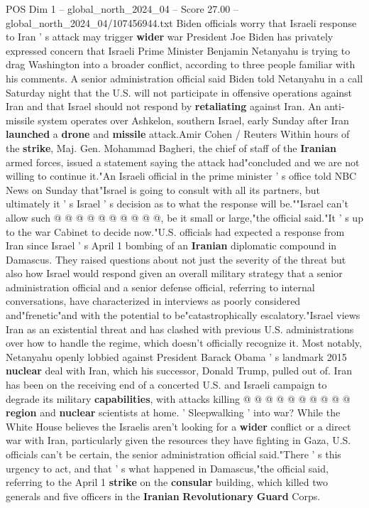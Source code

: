 \begin{textsample}{POS Dim 1 – global\_north\_2024\_04 – Score 27.00 – global\_north\_2024\_04/107456944.txt}  \label{ex:f1_pos_160}
Biden officials worry that Israeli response to Iran ' s attack may trigger \textbf{wider} war President Joe Biden has privately expressed concern that Israeli Prime Minister Benjamin Netanyahu is trying to drag Washington into a broader conflict, according to three people familiar with his comments.
A senior administration official said Biden told Netanyahu in a call Saturday night that the U.S. will not participate in offensive operations against Iran and that Israel should not respond by \textbf{retaliating} against Iran.
An anti-missile system operates over Ashkelon, southern Israel, early Sunday after Iran \textbf{launched} a \textbf{drone} and \textbf{missile} attack.Amir Cohen / Reuters Within hours of the \textbf{strike}, Maj.
Gen.
Mohammad Bagheri, the chief of staff of the \textbf{Iranian} armed forces, issued a statement saying the attack had"concluded and we are not willing to continue it."An Israeli official in the prime minister ' s office told NBC News on Sunday that"Israel is going to consult with all its partners, but ultimately it ' s Israel ' s decision as to what the response will be.""Israel can't allow such @ @ @ @ @ @ @ @ @ @, be it small or large,"the official said."It ' s up to the war Cabinet to decide now."U.S. officials had expected a response from Iran since Israel ' s April 1 bombing of an \textbf{Iranian} diplomatic compound in Damascus.
They raised questions about not just the severity of the threat but also how Israel would respond given an overall military strategy that a senior administration official and a senior defense official, referring to internal conversations, have characterized in interviews as poorly considered and"frenetic"and with the potential to be"catastrophically escalatory."Israel views Iran as an existential threat and has clashed with previous U.S. administrations over how to handle the regime, which doesn't officially recognize it.
Most notably, Netanyahu openly lobbied against President Barack Obama ' s landmark 2015 \textbf{nuclear} deal with Iran, which his successor, Donald Trump, pulled out of.
Iran has been on the receiving end of a concerted U.S. and Israeli campaign to degrade its military \textbf{capabilities}, with attacks killing @ @ @ @ @ @ @ @ @ @ \textbf{region} and \textbf{nuclear} scientists at home. ' Sleepwalking ' into war?
While the White House believes the Israelis aren't looking for a \textbf{wider} conflict or a direct war with Iran, particularly given the resources they have fighting in Gaza, U.S. officials can't be certain, the senior administration official said."There ' s this urgency to act, and that ' s what happened in Damascus,"the official said, referring to the April 1 \textbf{strike} on the \textbf{consular} building, which killed two generals and five officers in the \textbf{Iranian} \textbf{Revolutionary} \textbf{Guard} Corps.

\end{textsample}
